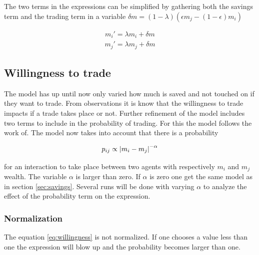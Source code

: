  The two terms in the expressions can be simplified by gathering both the savings term and the trading term in a variable $\delta m=(1-\lambda)(\epsilon m_j-(1-\epsilon)m_i)$
 
 \begin{align*}
	 m_i'=\lambda m_i+\delta m
 \end{align*}
 \begin{align*}
	 m_j'=\lambda m_j+\delta m
 \end{align*}

\subsection{Willingness to trade}

The model has up until now only varied how much is saved and not touched on if they want to trade. From observations it is know that the willingness to trade impacts if a trade takes place or not. Further refinement of the model includes two terms to include in the probability of trading. For this the model follows the work of.\cite{goswami} The model now takes into account that there is a probability

\begin{align}
	p_{ij}\propto \abs{m_i-m_j}^{-\alpha}\label{eq:willingness}
\end{align}

for an interaction to take place between two agents with respectively $m_i$ and $m_j$ wealth. The variable $\alpha$ is larger than zero. If $\alpha$ is zero one get the same model as in section \ref{sec:savings}. Several runs will be done with varying $\alpha$ to analyze the effect of the probability term on the expression.

\subsubsection{Normalization}
\label{sec:normalization1}
The equation \ref{eq:willingness} is not normalized. If one chooses a value less than one the expression will blow up and the probability becomes larger than one.\\

